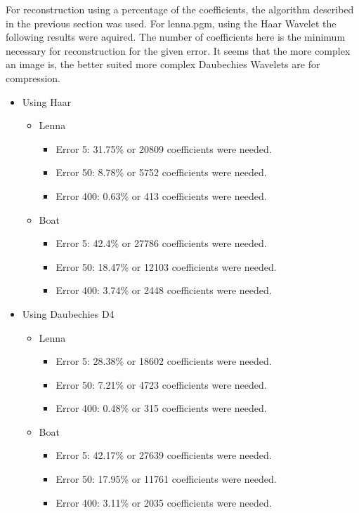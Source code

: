 For reconstruction using a percentage of the coefficients, the algorithm described in the previous section was used.  For lenna.pgm, using the Haar Wavelet the following results were aquired.  The number of coefficients here is the minimum necessary for reconstruction for the given error.  It seems that the more complex an image is, the better suited more complex Daubechies Wavelets are for compression. 


\begin{itemize}
\item Using Haar
\begin{itemize}
\item Lenna
\begin{itemize}
\item Error 5: 31.75\% or 20809 coefficients were needed.
\item Error 50: 8.78\% or 5752 coefficients were needed.
\item Error 400: 0.63\% or 413 coefficients were needed.
\end{itemize}

\item Boat
\begin{itemize}
\item Error 5: 42.4\% or 27786 coefficients were needed.
\item Error 50: 18.47\% or 12103 coefficients were needed.
\item Error 400: 3.74\% or 2448 coefficients were needed.
\end{itemize}
\end{itemize}
\item Using Daubechies D4
\begin{itemize}
\item Lenna
\begin{itemize}
\item Error 5: 28.38\% or 18602 coefficients were needed.
\item Error 50: 7.21\% or 4723 coefficients were needed.
\item Error 400: 0.48\% or 315 coefficients were needed.
\end{itemize}

\item Boat
\begin{itemize}
\item Error 5: 42.17\% or 27639 coefficients were needed.
\item Error 50: 17.95\% or 11761 coefficients were needed.
\item Error 400: 3.11\% or 2035 coefficients were needed.
\end{itemize}
\end{itemize}
\end{itemize}

